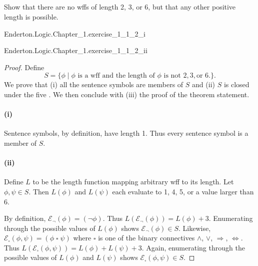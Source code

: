 \documentclass{report}
\begin{document}
\subsection{}%

  Show that there are no wffs of length 2, 3, or 6, but that any other positive
    length is possible.

    {Enderton.Logic.Chapter\_1.exercise\_1\_1\_2\_i}

    {Enderton.Logic.Chapter\_1.exercise\_1\_1\_2\_ii}

  \begin{proof}

    Define $$S = \{ \phi \mid
      \phi \text{ is a wff and the length of } \phi
        \text{ is not } 2, 3, \text{or } 6. \}.$$
    We prove that (i) all the sentence symbols are members of $S$ and (ii)
      $S$ is closed under the five .
    We then conclude with (iii) the proof of the theorem statement.

    \paragraph{(i)}%

      Sentence symbols, by definition, have length 1.
      Thus every sentence symbol is a member of $S$.

    \paragraph{(ii)}%

      Define $L$ to be the length function mapping arbitrary wff to its length.
      Let $\phi, \psi \in S$.
      Then $L(\phi)$ and $L(\psi)$ each evaluate to 1, 4, 5, or a value larger
        than 6.

      By definition, $\mathcal{E}_{\neg}(\phi) = (\neg \phi)$.
      Thus $L(\mathcal{E}_{\neg}(\phi)) = L(\phi) + 3$.
      Enumerating through the possible values of $L(\phi)$ shows
        $\mathcal{E}_{\neg}(\phi) \in S$.
      Likewise,
        $\mathcal{E}_{\square}(\phi, \psi) = (\phi \mathop{\square} \psi)$
        where $\square$ is one of the binary connectives $\land$, $\lor$,
          $\Rightarrow$, $\Leftrightarrow$.
      Thus $L(\mathcal{E}_{\square}(\phi, \psi)) = L(\phi) + L(\psi) + 3$.
      Again, enumerating through the possible values of $L(\phi)$ and $L(\psi)$
        shows $\mathcal{E}_{\square}(\phi, \psi) \in S$.


\end{proof}
\end{document}
